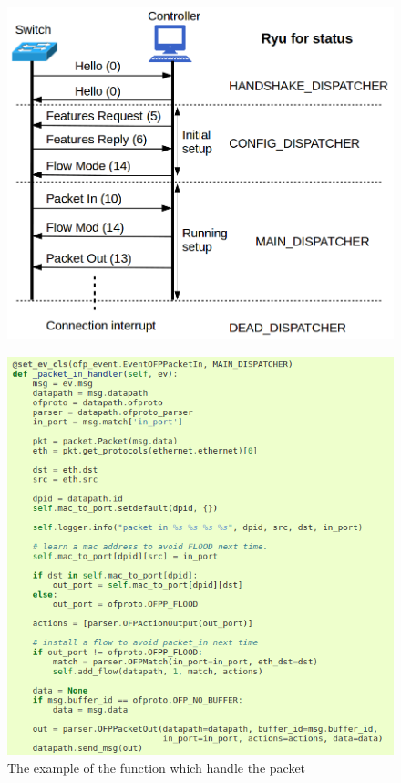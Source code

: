 \documentclass[a4paper,12pt]{report}
\begin{document}
\begin{large}
\begin{figure}[p]
	          	\includegraphics[width=1.0\textwidth]{ryu_graph.png}
	          
	      	\end{figure}
	     \begin{figure}[p]
	          \centering
	          \caption{The example of the function which handle the packet}
	          	\includegraphics[width=1.0\textwidth]{packet_in_handler.png}
	      	\end{figure}

\end{large}
\end{document}

